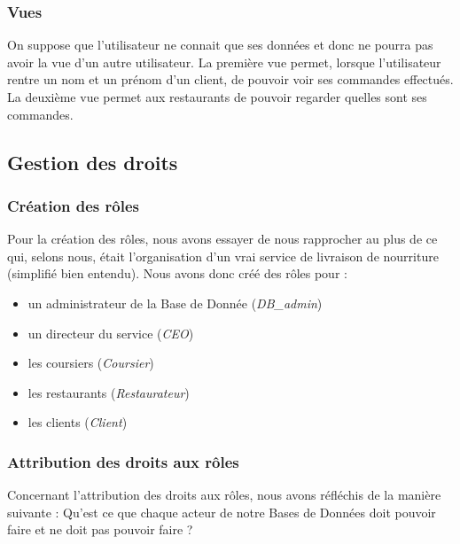 \documentclass[french]{article}
\begin{document}
            \subsubsection*{Vues}
            On suppose que l'utilisateur ne connait que ses données et donc ne pourra pas avoir la vue d'un autre utilisateur.\newline
            La première vue permet, lorsque l'utilisateur rentre un nom et un prénom d'un client, de pouvoir voir ses commandes effectués.
            La deuxième vue permet aux restaurants de pouvoir regarder quelles sont ses commandes.

        \subsection*{Gestion des droits}
            \subsubsection*{Création des rôles}
                Pour la création des rôles, nous avons essayer de nous rapprocher au plus de ce qui, selons nous, était l'organisation d'un vrai service de livraison de nourriture (simplifié bien entendu).
                Nous avons donc créé des rôles pour : 
                \begin{itemize}
                    \item un administrateur de la Base de Donnée (\textit{DB\_admin})
                    \item un directeur du service (\textit{CEO})
                    \item les coursiers (\textit{Coursier})
                    \item les restaurants (\textit{Restaurateur})
                    \item les clients (\textit{Client})
                \end{itemize}
            
            \subsubsection*{Attribution des droits aux rôles}
                Concernant l'attribution des droits aux rôles, nous avons réfléchis de la manière suivante : Qu'est ce que chaque acteur de notre Bases de Données doit pouvoir faire et ne doit pas pouvoir faire ?
\end{document}
